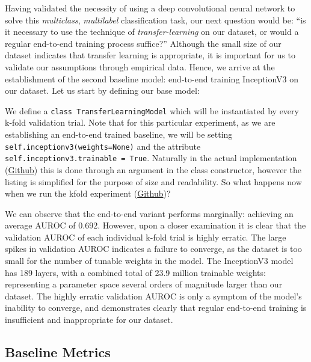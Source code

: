 Having validated the necessity of using a deep convolutional neural network to solve this \emph{multiclass}, \emph{multilabel} classification task, our next question would be: \enquote{is it necessary to use the technique of \emph{transfer-learning} on our dataset, or would a regular end-to-end training process suffice?} Although the small size of our dataset indicates that transfer learning is appropriate, it is important for us to validate our assumptions through empirical data. Hence, we arrive at the establishment of the second baseline model: end-to-end training InceptionV3 on our dataset. Let us start by defining our base model:



\noindent
We define a \texttt{class TransferLearningModel} which will be instantiated by every k-fold validation trial. Note that for this particular experiment, as we are establishing an end-to-end trained baseline, we will be setting \texttt{self.inceptionv3(weights=None)} and the attribute \texttt{self.inceptionv3.trainable = True}. Naturally in the actual implementation (\href{https://github.com/ShenZhouHong/radiography-ai-project/blob/cf8c9e9a1f07849787a98b2fc51df690354bf194/python/common/model.py}{Github}) this is done through an argument in the class constructor, however the listing is simplified for the purpose of size and readability. So what happens now when we run the kfold experiment (\href{https://github.com/ShenZhouHong/radiography-ai-project/blob/ef29e4cb63fc38185b3bb45fc37027df3e385a44/python/initial-evaluation/inceptionv3-end2end.ipynb}{Github})?



\noindent
We can observe that the end-to-end variant performs marginally: achieving an average AUROC of \(0.692\). However, upon a closer examination it is clear that the validation AUROC of each individual k-fold trial is highly erratic. The large spikes in validation AUROC indicates a failure to converge, as the dataset is too small for the number of tunable weights in the model. The InceptionV3 model has 189 layers, with a combined total of 23.9 million trainable weights: representing a parameter space several orders of magnitude larger than our dataset. The highly erratic validation AUROC is only a symptom of the model's inability to converge, and demonstrates clearly that regular end-to-end training is insufficient and inappropriate for our dataset.

\subsection{Baseline Metrics}


